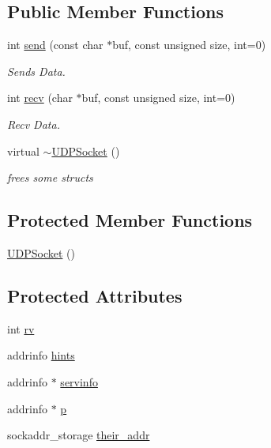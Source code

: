 \subsection*{Public Member Functions}
\begin{DoxyCompactItemize}
\item 
int \hyperlink{classUDPSocket_a1c6cf2ad03b21ad00029d5f51fde43f5}{send} (const char $\ast$buf, const unsigned size, int=0)
\begin{DoxyCompactList}\small\item\em Sends Data. \end{DoxyCompactList}\item 
int \hyperlink{classUDPSocket_a712f913657579110edb1f6befbc4a279}{recv} (char $\ast$buf, const unsigned size, int=0)
\begin{DoxyCompactList}\small\item\em Recv Data. \end{DoxyCompactList}\item 
virtual \hyperlink{classUDPSocket_adb1a5254938e5acf5d44ff7a347e9f0a}{$\sim$\+U\+D\+P\+Socket} ()
\begin{DoxyCompactList}\small\item\em frees some structs \end{DoxyCompactList}\end{DoxyCompactItemize}
\subsection*{Protected Member Functions}
\begin{DoxyCompactItemize}
\item 
\hyperlink{classUDPSocket_a4f86f3023f5a08f6355802599a10e100}{U\+D\+P\+Socket} ()
\end{DoxyCompactItemize}
\subsection*{Protected Attributes}
\begin{DoxyCompactItemize}
\item 
int \hyperlink{classUDPSocket_a8b28284b39fbfbd8bca4c1289f7dda32}{rv}
\item 
addrinfo \hyperlink{classUDPSocket_ab0ca283a6135c7073b7a1168014ae088}{hints}
\item 
addrinfo $\ast$ \hyperlink{classUDPSocket_ae0c699a5dbc10580cd2844f282e61f4d}{servinfo}
\item 
addrinfo $\ast$ \hyperlink{classUDPSocket_a9889d73171c2d143797dce81506d24eb}{p}
\item 
sockaddr\+\_\+storage \hyperlink{classUDPSocket_aee1dffc42ebe31dd0400b78d782978de}{their\+\_\+addr}
\end{DoxyCompactItemize}


